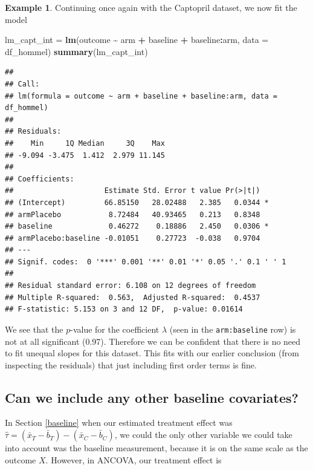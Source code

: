 \documentclass[
  openany]{book}
\newenvironment{Shaded}{\begin{snugshade}}{\end{snugshade}}
\newcommand{\AttributeTok}[1]{\textcolor[rgb]{0.13,0.29,0.53}{#1}}
\newcommand{\FunctionTok}[1]{\textcolor[rgb]{0.13,0.29,0.53}{\textbf{#1}}}
\newcommand{\NormalTok}[1]{#1}
\newcommand{\OtherTok}[1]{\textcolor[rgb]{0.56,0.35,0.01}{#1}}
\newcommand{\SpecialCharTok}[1]{\textcolor[rgb]{0.81,0.36,0.00}{\textbf{#1}}}
\theoremstyle{definition}
\theoremstyle{definition}
\newtheorem{example}{Example}[chapter]
\theoremstyle{definition}
\theoremstyle{definition}
\theoremstyle{remark}
\begin{document}
\begin{example}
Continuing once again with the Captopril dataset, we now fit the model

\begin{Shaded}
\begin{Highlighting}[]
\NormalTok{lm\_capt\_int }\OtherTok{=} \FunctionTok{lm}\NormalTok{(outcome }\SpecialCharTok{\textasciitilde{}}\NormalTok{ arm }\SpecialCharTok{+}\NormalTok{ baseline }\SpecialCharTok{+}\NormalTok{ baseline}\SpecialCharTok{:}\NormalTok{arm, }\AttributeTok{data =}\NormalTok{ df\_hommel)}
\FunctionTok{summary}\NormalTok{(lm\_capt\_int)}
\end{Highlighting}
\end{Shaded}

\begin{verbatim}
## 
## Call:
## lm(formula = outcome ~ arm + baseline + baseline:arm, data = df_hommel)
## 
## Residuals:
##    Min     1Q Median     3Q    Max 
## -9.094 -3.475  1.412  2.979 11.145 
## 
## Coefficients:
##                     Estimate Std. Error t value Pr(>|t|)  
## (Intercept)         66.85150   28.02488   2.385   0.0344 *
## armPlacebo           8.72484   40.93465   0.213   0.8348  
## baseline             0.46272    0.18886   2.450   0.0306 *
## armPlacebo:baseline -0.01051    0.27723  -0.038   0.9704  
## ---
## Signif. codes:  0 '***' 0.001 '**' 0.01 '*' 0.05 '.' 0.1 ' ' 1
## 
## Residual standard error: 6.108 on 12 degrees of freedom
## Multiple R-squared:  0.563,  Adjusted R-squared:  0.4537 
## F-statistic: 5.153 on 3 and 12 DF,  p-value: 0.01614
\end{verbatim}

We see that the \(p\)-value for the coefficient \(\lambda\) (seen in the \texttt{arm:baseline} row) is not at all significant (0.97). Therefore we can be confident that there is no need to fit unequal slopes for this dataset. This fits with our earlier conclusion (from inspecting the residuals) that just including first order terms is fine.
\end{example}

\hypertarget{can-we-include-any-other-baseline-covariates}{%
\subsection{Can we include any other baseline covariates?}\label{can-we-include-any-other-baseline-covariates}}

In Section \ref{baseline} when our estimated treatment effect was \(\hat\tau = \left(\bar{x}_T - \bar{b}_T\right) - \left(\bar{x}_C - \bar{b}_C\right)\), we could the only other variable we could take into account was the baseline measurement, because it is on the same scale as the outcome \(X\). However, in ANCOVA, our treatment effect is
\end{document}
